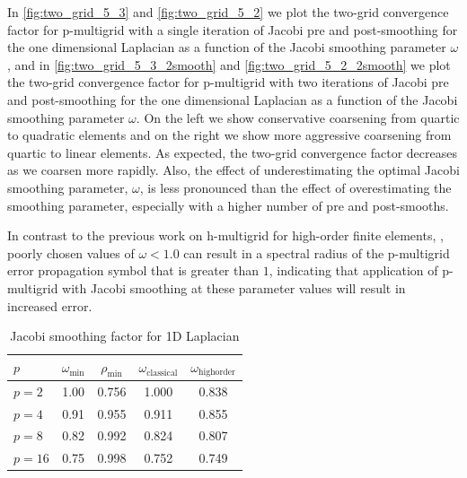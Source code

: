 \documentclass[review]{siamart190516}
\begin{document}
In \cref{fig:two_grid_5_3} and \cref{fig:two_grid_5_2} we plot the two-grid convergence factor for p-multigrid with a single iteration of Jacobi pre and post-smoothing for the one dimensional Laplacian as a function of the Jacobi smoothing parameter $\omega$,
and in \cref{fig:two_grid_5_3_2smooth} and \cref{fig:two_grid_5_2_2smooth} we plot the two-grid convergence factor for p-multigrid with two iterations of Jacobi pre and post-smoothing for the one dimensional Laplacian as a function of the Jacobi smoothing parameter $\omega$.
On the left we show conservative coarsening from quartic to quadratic elements and on the right we show more aggressive coarsening from quartic to linear elements.
As expected, the two-grid convergence factor decreases as we coarsen more rapidly.
Also, the effect of underestimating the optimal Jacobi smoothing parameter, $\omega$, is less pronounced than the effect of overestimating the smoothing parameter, especially with a higher number of pre and post-smooths.

In contrast to the previous work on h-multigrid for high-order finite elements, \cite{he2020two}, poorly chosen values of $\omega < 1.0$ can result in a spectral radius of the p-multigrid error propagation symbol that is greater than $1$, indicating that application of p-multigrid with Jacobi smoothing at these parameter values will result in increased error.

\begin{table}[ht!]
\begin{center}
\begin{tabular}{l c c c c}
  \toprule
  $p$       &  $\omega_{\min}$  &  $\rho_{\min}$  &  $\omega_{\text{classical}}$  &  $\omega_{\text{highorder}}$  \\
  \midrule
  $p = 2$   &  1.00  &  0.756  & 1.000  &  0.838  \\
  $p = 4$   &  0.91  &  0.955  & 0.911  &  0.855  \\
  $p = 8$   &  0.82  &  0.992  & 0.824  &  0.807  \\
  $p = 16$  &  0.75  &  0.998  & 0.752  &  0.749  \\
  \bottomrule
\end{tabular}
\end{center}
\caption{Jacobi smoothing factor for 1D Laplacian}
\label{table:smoothing_factor_1d_jacobi}
\end{table}
\end{document}
